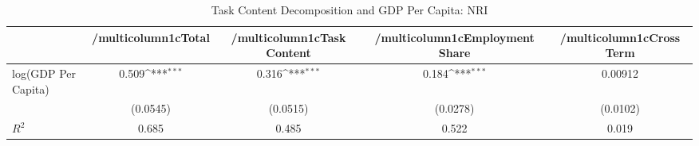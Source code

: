 \begin{table}[htbp]\centering
\def\sym#1{\ifmmode^{#1}\else\(^{#1}\)\fi}
\caption{Task Content Decomposition and GDP Per Capita: NRI}
\begin{tabular}{l*{4}{c}}
\hline\hline
            &/multicolumn{1}{c}{Total}&/multicolumn{1}{c}{Task Content}&/multicolumn{1}{c}{Employment Share}&/multicolumn{1}{c}{Cross Term}\\
\hline
log(GDP Per Capita)&       0.509\sym{***}&       0.316\sym{***}&       0.184\sym{***}&     0.00912         \\
            &    (0.0545)         &    (0.0515)         &    (0.0278)         &    (0.0102)         \\

\(R^{2}\)   &       0.685         &       0.485         &       0.522         &       0.019         \\
\hline\hline
\end{tabular}
\end{table}
